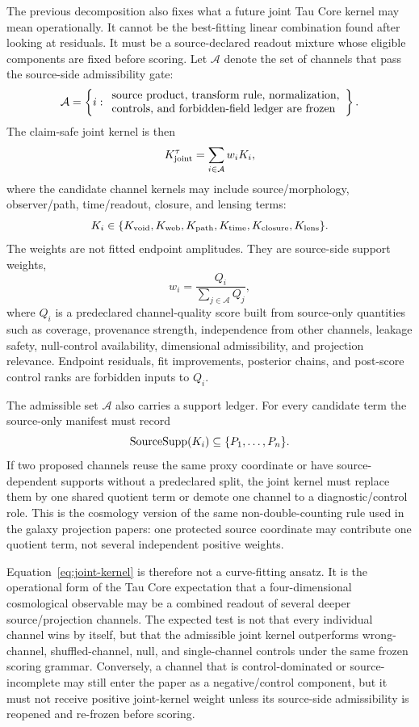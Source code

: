 \documentclass[11pt]{article}
\begin{document}
The previous decomposition also fixes what a future joint Tau Core kernel may
mean operationally.  It cannot be the best-fitting linear combination found
after looking at residuals.  It must be a source-declared readout mixture whose
eligible components are fixed before scoring.  Let
\(\mathcal A\) denote the set of channels that pass the source-side
admissibility gate:
\[
\mathcal A
=\left\{i:
\begin{array}{l}
\hbox{source product, transform rule, normalization,}\\
\hbox{controls, and forbidden-field ledger are frozen}
\end{array}
\right\}.
\]
The claim-safe joint kernel is then
\begin{equation}
K_{\rm joint}^{\tau}
=
\sum_{i\in\mathcal A} w_i K_i,
\label{eq:joint-kernel}
\end{equation}
where the candidate channel kernels may include source/morphology,
observer/path, time/readout, closure, and lensing terms:
\[
K_i\in
\{K_{\rm void},K_{\rm web},K_{\rm path},K_{\rm time},
K_{\rm closure},K_{\rm lens}\}.
\]
The weights are not fitted endpoint amplitudes.  They are source-side support
weights,
\begin{equation}
w_i=\frac{Q_i}{\sum_{j\in\mathcal A}Q_j},
\label{eq:joint-source-weight}
\end{equation}
where \(Q_i\) is a predeclared channel-quality score built from source-only
quantities such as coverage, provenance strength, independence from other
channels, leakage safety, null-control availability, dimensional admissibility,
and projection relevance.  Endpoint residuals, fit improvements, posterior
chains, and post-score control ranks are forbidden inputs to \(Q_i\).

The admissible set \(\mathcal A\) also carries a support ledger.  For every
candidate term the source-only manifest must record
\[
{\rm SourceSupp}(K_i)\subseteq\{P_1,\ldots,P_n\}.
\]
If two proposed channels reuse the same proxy coordinate or have
source-dependent supports without a predeclared split, the joint kernel must
replace them by one shared quotient term or demote one channel to a
diagnostic/control role.  This is the cosmology version of the same
non-double-counting rule used in the galaxy projection papers: one protected
source coordinate may contribute one quotient term, not several independent
positive weights.

Equation~\eqref{eq:joint-kernel} is therefore not a curve-fitting ansatz.  It
is the operational form of the Tau Core expectation that a four-dimensional
cosmological observable may be a combined readout of several deeper
source/projection channels.  The expected test is not that every individual
channel wins by itself, but that the admissible joint kernel outperforms
wrong-channel, shuffled-channel, null, and single-channel controls under the
same frozen scoring grammar.  Conversely, a channel that is control-dominated
or source-incomplete may still enter the paper as a negative/control component,
but it must not receive positive joint-kernel weight unless its source-side
admissibility is reopened and re-frozen before scoring.
\end{document}
